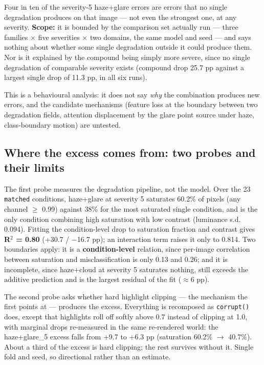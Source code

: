 Four in ten of the severity-5 haze+glare errors are errors that no single degradation produces on that image --- not even the strongest one, at any severity. \textbf{Scope:} it is bounded by the comparison set actually run --- three families $\times$ five severities $\times$ two domains, the same model and seed --- and says nothing about whether some single degradation outside it could produce them. Nor is it explained by the compound being simply more severe, since no single degradation of comparable severity exists (compound drop 25.7 pp against a largest single drop of 11.3 pp, in all six runs).

This is a behavioural analysis: it does not say \emph{why} the combination produces new errors, and the candidate mechanisms (feature loss at the boundary between two degradation fields, attention displacement by the glare point source under haze, class-boundary motion) are untested.

\subsection{Where the excess comes from: two probes and their limits}
The first probe measures the degradation pipeline, not the model. Over the 23 \texttt{matched} conditions, haze+glare at severity 5 saturates 60.2\% of pixels (any channel $\geq$ 0.99) against 38\% for the most saturated single condition, and is the only condition combining high saturation with low contrast (luminance s.d. 0.094). Fitting the condition-level drop to saturation fraction and contrast gives \textbf{R$^2$ = 0.80} (+30.7 / $-$16.7 pp); an interaction term raises it only to 0.814. Two boundaries apply: it is a \textbf{condition-level} relation, since per-image correlation between saturation and misclassification is only 0.13 and 0.26; and it is incomplete, since haze+cloud at severity 5 saturates nothing, still exceeds the additive prediction and is the largest residual of the fit ($\approx$6 pp).

The second probe asks whether hard highlight clipping --- the mechanism the first points at --- produces the excess. Everything is recomposed as \texttt{corrupt()} does, except that highlights roll off softly above 0.7 instead of clipping at 1.0, with marginal drops re-measured in the same re-rendered world: the haze+glare\_5 excess falls from +9.7 to +6.3 pp (saturation 60.2\% $\to$ 40.7\%). About a third of the excess is hard clipping; the rest survives without it. Single fold and seed, so directional rather than an estimate.


